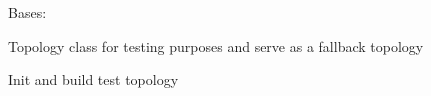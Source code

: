 \documentclass[letterpaper,10pt,english]{sphinxmanual}
\begin{document}

\begin{fulllineitems}
\label{infr/topology:escape.infr.topology.BackupTopology}
Bases: {\hyperref[infr/topology:escape.infr.topology.AbstractTopology]{\emph{}}}

Topology class for testing purposes and serve as a fallback topology

\begin{fulllineitems}
\label{infr/topology:escape.infr.topology.BackupTopology.__init__}
Init and build test topology

\end{fulllineitems}


\end{fulllineitems}

\end{document}
